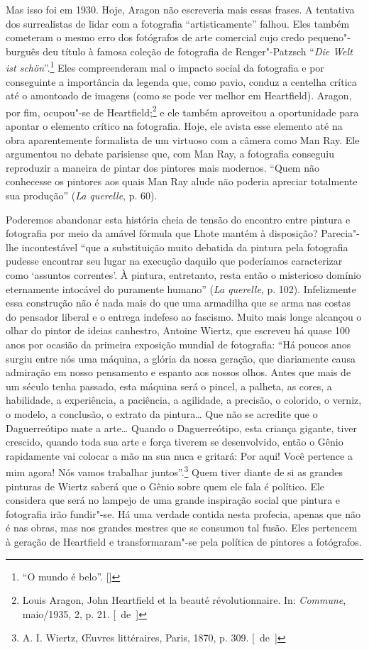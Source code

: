 Mas isso foi em 1930. Hoje, Aragon não escreveria mais essas frases. A
tentativa dos surrealistas de lidar com a fotografia ``artisticamente''
falhou. Eles também cometeram o mesmo erro dos fotógrafos de arte
comercial cujo credo pequeno"-burguês deu título à famosa
coleção de fotografia de Renger"-Patzsch ``\emph{Die Welt ist schön}''.\footnote{``O mundo é belo''. []} Eles compreenderam mal o impacto social da
fotografia e por conseguinte a importância da legenda que, como pavio, conduz a
centelha crítica até o amontoado de imagens (como se pode ver melhor em
Heartfield). Aragon, por fim, ocupou"-se de Heartfield;\footnote{Louis
  Aragon, John Heartfield et la beauté révolutionnaire. In: \emph{Commune},
  maio/1935, 2, p. 21. [~de~]} e ele também aproveitou a oportunidade
para apontar o elemento crítico na fotografia. Hoje, ele avista esse
elemento até na obra aparentemente formalista de um virtuoso com a câmera
como Man Ray. Ele argumentou no debate parisiense que, com Man Ray, a
fotografia conseguiu reproduzir a maneira de pintar dos pintores mais
modernos. ``Quem não conhecesse os pintores aos quais Man Ray alude não
poderia apreciar totalmente sua produção'' (\emph{La querelle}, p. 60).

Poderemos abandonar esta história cheia de tensão do encontro entre
pintura e fotografia por meio da amável fórmula que Lhote mantém à
disposição? Parecia"-lhe incontestável ``que a substituição muito
debatida da pintura pela fotografia pudesse encontrar seu lugar na
execução daquilo que poderíamos caracterizar como `assuntos correntes'. À
pintura, entretanto, resta então o misterioso domínio eternamente
intocável do puramente humano'' (\emph{La querelle}, p. 102).
Infelizmente essa construção não é nada mais do que uma armadilha que
se arma nas costas do pensador liberal e o entrega indefeso ao fascismo.
Muito mais longe alcançou o olhar do pintor de ideias canhestro, Antoine
Wiertz, que escreveu há quase 100 anos por ocasião da primeira exposição
mundial de fotografia: ``Há poucos anos surgiu entre nós uma máquina, a
glória da nossa geração, que diariamente causa admiração em nosso
pensamento e espanto aos nossos olhos. Antes que mais de um século tenha
passado, esta máquina será o pincel, a palheta, as cores, a habilidade,
a experiência, a paciência, a agilidade, a precisão, o colorido, o
verniz, o modelo, a conclusão, o extrato da pintura\ldots{} Que não se
acredite que o Daguerreótipo mate a arte\ldots{} Quando o Daguerreótipo, esta
criança gigante, tiver crescido, quando toda sua arte e força tiverem se
desenvolvido, então o Gênio rapidamente vai colocar a mão na sua nuca e
gritará: Por aqui! Você pertence a mim agora! Nós vamos trabalhar
juntos''.\footnote{A. I. Wiertz, \OE uvres littéraires, Paris, 1870, p. 309. [~de~]}
Quem tiver diante de si as grandes pinturas de Wiertz saberá que o Gênio
sobre quem ele fala é político. Ele considera que será no lampejo de uma
grande inspiração social que pintura e fotografia irão fundir"-se. Há uma
verdade contida nesta profecia, apenas que não é nas obras, mas nos
grandes mestres que se consumou tal fusão. Eles pertencem à geração de
Heartfield e transformaram"-se pela política de pintores a fotógrafos.

